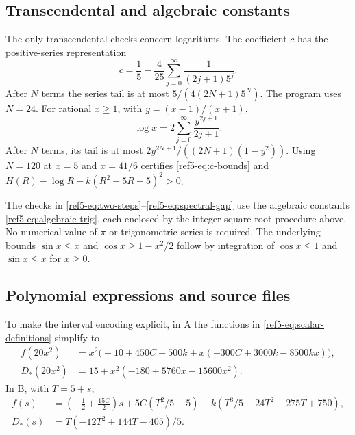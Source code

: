 \documentclass[11pt]{article}
\theoremstyle{remark}
\numberwithin{equation}{section}
\begin{document}
\subsection{Transcendental and algebraic constants}
The only transcendental checks concern logarithms.
The coefficient $c$ has the positive-series representation
\[
 c=\frac15-\frac4{25}\sum_{j=0}^{\infty}
                \frac1{(2j+1)5^j}.
\]
After $N$ terms the series tail is at most
$5/(4(2N+1)5^N)$. The program uses $N=24$.
For rational $x\ge1$, with $y=(x-1)/(x+1)$,
\[
 \log x=2\sum_{j=0}^{\infty}\frac{y^{2j+1}}{2j+1}.
\]
After $N$ terms, its tail is at most
$2y^{2N+1}/((2N+1)(1-y^2))$.
Using $N=120$ at $x=5$ and $x=41/6$ certifies
\eqref{ref5-eq:c-bounds} and
$H(R)-\log R-k(R^2-5R+5)^2>0$.

The checks in \eqref{ref5-eq:two-steps}--\eqref{ref5-eq:spectral-gap}
use the algebraic constants \eqref{ref5-eq:algebraic-trig}, each enclosed by
the integer-square-root procedure above.
No numerical value of $\pi$ or trigonometric series is required.
The underlying bounds $\sin x\le x$ and $\cos x\ge1-x^2/2$ follow
by integration of $\cos x\le1$ and $\sin x\le x$ for $x\ge0$.

\subsection{Polynomial expressions and source files}
To make the interval encoding explicit, in A the functions in
\eqref{ref5-eq:scalar-definitions} simplify to
\begin{equation}\label{ref5-eq:branch-A}
\begin{aligned}
 f(20x^2)&=x^2\bigl(-10+450C-500k
             +x(-300C+3000k-8500kx)\bigr),\\
 D_*(20x^2)&=15+x^2(-180+5760x-15600x^2).
\end{aligned}
\end{equation}
In B, with $T=5+s$,
\begin{equation}\label{ref5-eq:branch-B}
\begin{aligned}
 f(s)&=\left(-\frac12+\frac{15C}{2}\right)s
       +5C(T^2/5-5)
       -k(T^3/5+24T^2-275T+750),\\
 D_*(s)&=T(-12T^2+144T-405)/5.
\end{aligned}
\end{equation}
\end{document}
